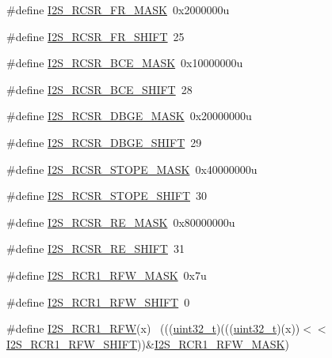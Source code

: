 \begin{DoxyCompactItemize}
\#define \hyperlink{group___i2_s___register___masks_ga33b3d3641e9acb08f9c001d655f22de7}{I2\+S\+\_\+\+R\+C\+S\+R\+\_\+\+F\+R\+\_\+\+M\+A\+SK}~0x2000000u
\item 
\#define \hyperlink{group___i2_s___register___masks_gafee534215dedadf1826ad34193850dca}{I2\+S\+\_\+\+R\+C\+S\+R\+\_\+\+F\+R\+\_\+\+S\+H\+I\+FT}~25
\item 
\#define \hyperlink{group___i2_s___register___masks_ga54ae667249649209bb97b5bbbc5fd782}{I2\+S\+\_\+\+R\+C\+S\+R\+\_\+\+B\+C\+E\+\_\+\+M\+A\+SK}~0x10000000u
\item 
\#define \hyperlink{group___i2_s___register___masks_ga6db23fcadacc96fdf65ce93ff944c40d}{I2\+S\+\_\+\+R\+C\+S\+R\+\_\+\+B\+C\+E\+\_\+\+S\+H\+I\+FT}~28
\item 
\#define \hyperlink{group___i2_s___register___masks_ga3b612d1b86edf89a8e6c3bfb5a8bce4e}{I2\+S\+\_\+\+R\+C\+S\+R\+\_\+\+D\+B\+G\+E\+\_\+\+M\+A\+SK}~0x20000000u
\item 
\#define \hyperlink{group___i2_s___register___masks_ga631cd411a0272dfbd2cf89390a60ae98}{I2\+S\+\_\+\+R\+C\+S\+R\+\_\+\+D\+B\+G\+E\+\_\+\+S\+H\+I\+FT}~29
\item 
\#define \hyperlink{group___i2_s___register___masks_ga44e7cececc92de704481e691cf2d07da}{I2\+S\+\_\+\+R\+C\+S\+R\+\_\+\+S\+T\+O\+P\+E\+\_\+\+M\+A\+SK}~0x40000000u
\item 
\#define \hyperlink{group___i2_s___register___masks_ga6bb5b025ffa2d2916eec0a3fc9a973aa}{I2\+S\+\_\+\+R\+C\+S\+R\+\_\+\+S\+T\+O\+P\+E\+\_\+\+S\+H\+I\+FT}~30
\item 
\#define \hyperlink{group___i2_s___register___masks_gad72205d781328e9b391811123b8e115f}{I2\+S\+\_\+\+R\+C\+S\+R\+\_\+\+R\+E\+\_\+\+M\+A\+SK}~0x80000000u
\item 
\#define \hyperlink{group___i2_s___register___masks_gaedda1d8255b891c8abfaf0104a73e6bf}{I2\+S\+\_\+\+R\+C\+S\+R\+\_\+\+R\+E\+\_\+\+S\+H\+I\+FT}~31
\item 
\#define \hyperlink{group___i2_s___register___masks_gaa01b4e3c93f7d6e394ae98744b23ce2e}{I2\+S\+\_\+\+R\+C\+R1\+\_\+\+R\+F\+W\+\_\+\+M\+A\+SK}~0x7u
\item 
\#define \hyperlink{group___i2_s___register___masks_ga0377763c289535be469c9c34d4e5db0a}{I2\+S\+\_\+\+R\+C\+R1\+\_\+\+R\+F\+W\+\_\+\+S\+H\+I\+FT}~0
\item 
\#define \hyperlink{group___i2_s___register___masks_ga0049052eccf44a52981b7ebbe270d433}{I2\+S\+\_\+\+R\+C\+R1\+\_\+\+R\+FW}(x)                                                ~(((\hyperlink{_p_e___types_8h_a33594304e786b158f3fb30289278f5af}{uint32\+\_\+t})(((\hyperlink{_p_e___types_8h_a33594304e786b158f3fb30289278f5af}{uint32\+\_\+t})(x))$<$$<$\hyperlink{group___i2_s___register___masks_ga0377763c289535be469c9c34d4e5db0a}{I2\+S\+\_\+\+R\+C\+R1\+\_\+\+R\+F\+W\+\_\+\+S\+H\+I\+FT}))\&\hyperlink{group___i2_s___register___masks_gaa01b4e3c93f7d6e394ae98744b23ce2e}{I2\+S\+\_\+\+R\+C\+R1\+\_\+\+R\+F\+W\+\_\+\+M\+A\+SK})
$$
\end{DoxyCompactItemize}
